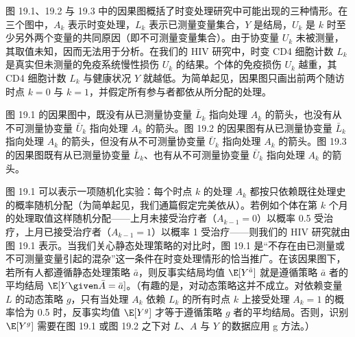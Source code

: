 图 19.1、19.2 与 19.3 中的因果图概括了时变处理研究中可能出现的三种情形。在三个图中，$A_k$ 表示时变处理，$L_k$ 表示已测量变量集合，$Y$ 是结局，$U_k$ 是 $k$ 时至少另外两个变量的共同原因（即不可测量变量集合）。由于协变量 $U_k$ 未被测量，其取值未知，因而无法用于分析。在我们的 HIV 研究中，时变 CD4 细胞计数 $L_k$ 是真实但未测量的免疫系统慢性损伤 $U_k$ 的结果。个体的免疫损伤 $U_k$ 越重，其 CD4 细胞计数 $L_k$ 与健康状况 $Y$ 就越低。为简单起见，因果图只画出前两个随访时点 $k=0$ 与 $k=1$，并假定所有参与者都依从所分配的处理。

图 19.1 的因果图中，既没有从已测量协变量 $\bar{L}_k$ 指向处理 $A_k$ 的箭头，也没有从不可测量协变量 $\bar{U}_k$ 指向处理 $A_k$ 的箭头。图 19.2 的因果图有从已测量协变量 $\bar{L}_k$ 指向处理 $A_k$ 的箭头，但没有从不可测量协变量 $\bar{U}_k$ 指向处理 $A_k$ 的箭头。图 19.3 的因果图既有从已测量协变量 $\bar{L}_k$、也有从不可测量协变量 $\bar{U}_k$ 指向处理 $A_k$ 的箭头。

\begin{figure}[htbp]
\centering
{}
\caption{}
\label{fig:19.1}
\end{figure}

图 19.1 可以表示一项随机化实验：每个时点 $k$ 的处理 $A_k$ 都按只依赖既往处理史的概率随机分配（为简单起见，我们通篇假定完美依从）。若例如个体在第 $k$ 个月的处理取值这样随机分配——上月未接受治疗者（$A_{k-1}=0$）以概率 0.5 受治疗，上月已接受治疗者（$A_{k-1}=1$）以概率 1 受治疗——则我们的 HIV 研究就由图 19.1 表示。当我们关心静态处理策略的对比时，图 19.1 是“不存在由已测量或不可测量变量引起的混杂”这一条件在时变处理情形的恰当推广。在该因果图下，若所有人都遵循静态处理策略 $\bar{a}$，则反事实结局均值 $\E[Y^{\bar{a}}]$ 就是遵循策略 $\bar{a}$ 者的平均结局 $\E[Y\given \bar{A}=\bar{a}]$。（有趣的是，对动态策略这并不成立。对依赖变量 $L$ 的动态策略 $g$，只有当处理 $A_k$ 依赖 $L_k$ 的所有时点 $k$ 上接受处理 $A_k=1$ 的概率恰为 0.5 时，反事实均值 $\E[Y^g]$ 才等于遵循策略 $g$ 者的平均结局。否则，识别 $\E[Y^g]$ 需要在图 19.1 或图 19.2 之下对 $L$、$A$ 与 $Y$ 的数据应用 g 方法。）

